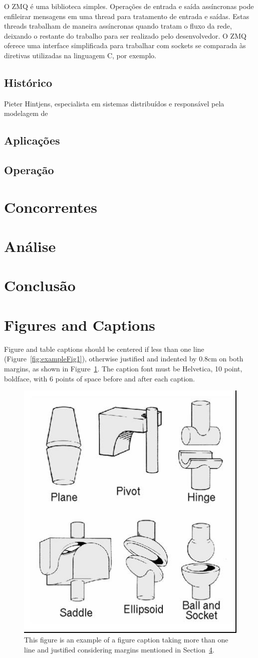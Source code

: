 \documentclass[12pt]{article}
\begin{document}
O ZMQ é uma biblioteca simples. Operações de entrada e saída assíncronas pode enfileirar mensagens em
uma thread para tratamento de entrada e saídas. Estas threads trabalham de maneira assíncronas quando 
tratam o fluxo da rede, deixando o restante do trabalho para ser realizado pelo desenvolvedor. O ZMQ 
oferece uma interface simplificada para trabalhar com sockets se comparada às diretivas utilizadas
na linguagem C, por exemplo.

\subsection{Histórico}
Pieter Hintjens, especialista em sistemas distribuídos e responsável pela modelagem de 


\subsection{Aplicações}
\subsection{Operação}

\section{Concorrentes}

\section{Análise}
\section{Conclusão}

\section{Figures and Captions}\label{sec:figs}


Figure and table captions should be centered if less than one line
(Figure~\ref{fig:exampleFig1}), otherwise justified and indented by 0.8cm on
both margins, as shown in Figure~\ref{fig:exampleFig2}. The caption font must
be Helvetica, 10 point, boldface, with 6 points of space before and after each
caption.

\begin{figure}[ht]
\centering
\includegraphics[width=.3\textwidth]{fig2.jpg}
\caption{This figure is an example of a figure caption taking more than one
  line and justified considering margins mentioned in Section~\ref{sec:figs}.}
\label{fig:exampleFig2}
\end{figure}
\end{document}
